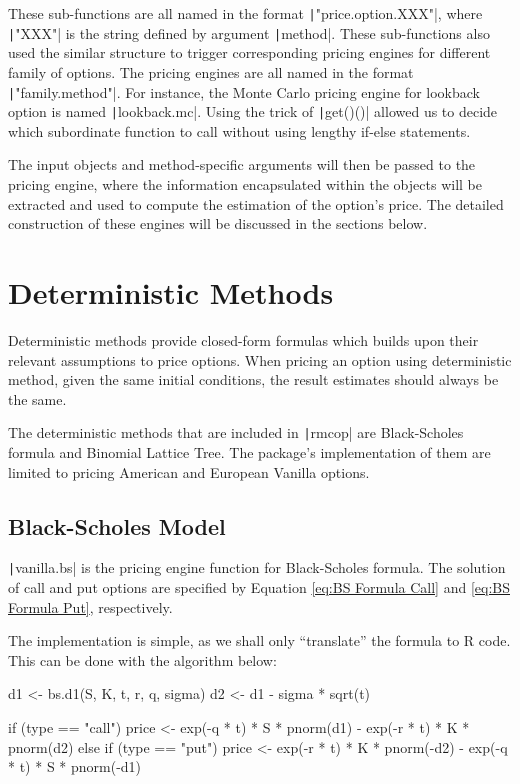 These sub-functions are all named in the format \texttt|"price.option.XXX"|, where \texttt|"XXX"| is the string defined by argument \texttt|method|. These sub-functions also used the similar structure to trigger corresponding pricing engines for different family of options. The pricing engines are all named in the format \texttt|"family.method"|. For instance, the Monte Carlo pricing engine for lookback option is named \texttt|lookback.mc|. Using the trick of \texttt|get()()| allowed us to decide which subordinate function to call without using lengthy if-else statements.

The input objects and method-specific arguments will then be passed to the pricing engine, where the information encapsulated within the objects will be extracted and used to compute the estimation of the option's price. The detailed construction of these engines will be discussed in the sections below.

\section{Deterministic Methods} \label{sec:det_dev}

Deterministic methods provide closed-form formulas which builds upon their relevant assumptions to price options. When pricing an option using deterministic method, given the same initial conditions, the result estimates should always be the same.

The deterministic methods that are included in \texttt|rmcop| are Black-Scholes formula and Binomial Lattice Tree. The package's implementation of them are limited to pricing American and European Vanilla options.

\subsection{Black-Scholes Model}

\texttt|vanilla.bs| is the pricing engine function for Black-Scholes formula. The solution of call and put options are specified by Equation \ref{eq:BS Formula Call} and \ref{eq:BS Formula Put}, respectively.

The implementation is simple, as we shall only ``translate'' the formula to R code. This can be done with the algorithm below:

\begin{Rminted}
d1 <- bs.d1(S, K, t, r, q, sigma)
d2 <- d1 - sigma * sqrt(t)

if (type == "call") {
    price <- exp(-q * t) * S * pnorm(d1) - exp(-r * t) * K * pnorm(d2)
} else if (type == "put") {
    price <- exp(-r * t) * K * pnorm(-d2) - exp(-q * t) * S * pnorm(-d1)
}
\end{Rminted}

